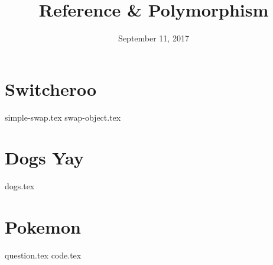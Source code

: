 \documentclass{exam}
\title{Reference \& Polymorphism}
\date{September 11, 2017}
\begin{document}
\maketitle
\notes

\section{Switcheroo}
\begin{questions}
{simple-swap.tex}
{swap-object.tex}
\end{questions}

\clearpage

\section{Dogs Yay}
\begin{questions}
{dogs.tex}
\end{questions}

\clearpage

\section{Pokemon}
\begin{questions}
{question.tex}
{code.tex}
\end{questions}
\end{document}
